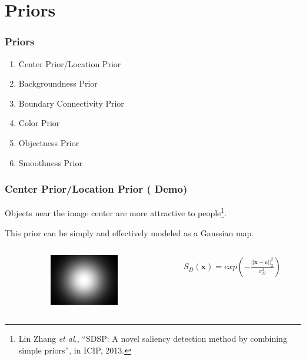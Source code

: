 \documentclass[notheorems,serif,table,compress]{beamer}  %
\begin{document}
\section{Priors}

\begin{frame}
\frametitle{Priors}
\begin{enumerate}
\item Center Prior/Location Prior
\item Backgroundness Prior
\item Boundary Connectivity Prior
\item Color Prior
\item Objectness Prior
\item Smoothness Prior
\end{enumerate}
\end{frame}


\begin{frame}
\frametitle{ Center Prior/Location Prior (\color{yellow} \textbf{Demo})}
{\color{blue}Objects near the image center are more attractive to people}\footnote{Lin Zhang \textit{et al.}, ``SDSP: A novel saliency detection method by combining simple priors'', in ICIP, 2013.}{\color{blue}.}

\vspace{0.15in}

This prior can be simply and effectively modeled as a Gaussian map.

\vspace{0.15in}

\begin{columns}
\begin{column}{\leftmargini}
\end{column}
\hspace{-1in}
\begin{column}{0.1\linewidth}
\centering\includegraphics[width=3cm]{CenterPrior}
\end{column}
\begin{column}{0.7\linewidth}
\begin{align}
S_D(\textbf{x}) = exp\left(-\frac{||\textbf{x}-\textbf{c}||_2^2}{\sigma_D^2}\right)
\end{align}
\end{column}
\end{columns}\vspace{1ex}
\vspace{-0.4in}
\end{frame}
\end{document}
